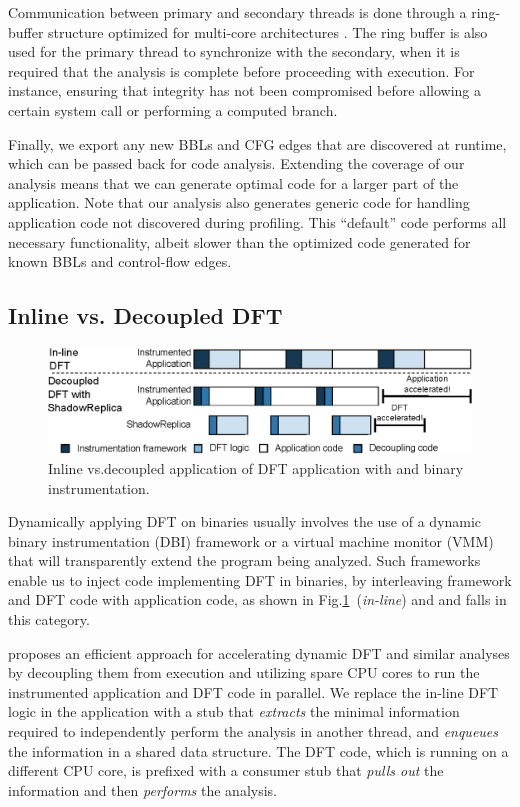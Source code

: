 Communication between primary and secondary threads is done through a
ring-buffer structure optimized for multi-core architectures . The ring buffer
is also used for the primary thread to synchronize with the secondary, when it
is required that the analysis is complete before proceeding with execution. For
instance, ensuring that integrity has not been compromised before allowing a
certain system call or performing a computed branch.

Finally, we export any new BBLs and CFG edges that are discovered at runtime,
which can be passed back for code analysis. Extending the coverage of our
analysis means that we can generate optimal code for a larger part of the
application. Note that our analysis also generates generic code for handling
application code not discovered during profiling. This “default” code performs
all necessary functionality, albeit slower than the optimized code generated
for known BBLs and control-flow edges.

\subsection{Inline vs. Decoupled DFT}
\label{sec:inlinevsdecoupled}

\begin{figure}[tb]
    \centering
    \includegraphics[width=0.65\linewidth]{figs/decoupling.eps}
    \caption{Inline vs.decoupled application of DFT application with \sreplica
    and binary instrumentation.\label{fig:decoupling}}
\end{figure}

Dynamically applying DFT on binaries usually involves the use of a dynamic
binary instrumentation (DBI) framework or a virtual machine monitor (VMM) that
will transparently extend the program being analyzed. Such frameworks enable us
to inject code implementing DFT in binaries, by interleaving framework and DFT
code with application code, as shown in
Fig.\ref{fig:decoupling}~(\textit{in-line}) and \libdft and \tfa falls in this
category.

\sreplica proposes an efficient approach for accelerating dynamic DFT and similar
analyses by decoupling them from execution and utilizing spare CPU cores to run
the instrumented application and DFT code in parallel. We replace the in-line
DFT logic in the application with a stub that \emph{extracts} the minimal
information required to independently perform the analysis in another thread,
and \emph{enqueues} the information in a shared data structure. The DFT code,
which is running on a different CPU core, is prefixed with a consumer stub that
\emph{pulls out} the information and then \emph{performs} the analysis.


